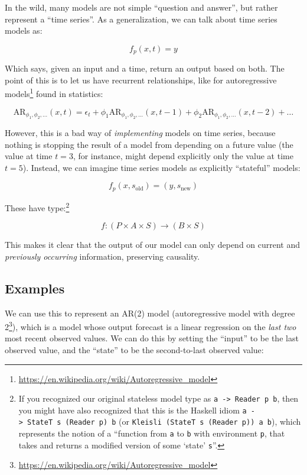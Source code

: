\documentclass[]{article}
\renewcommand{\href}[2]{#2\footnote{\url{#1}}}
\begin{document}
In the wild, many models are not simple ``question and answer'', but rather
represent a ``time series''. As a generalization, we can talk about time series
models as:

\[
f_p(x,t) = y
\]

Which says, given an input and a time, return an output based on both. The point
of this is to let us have recurrent relationships, like for
\href{https://en.wikipedia.org/wiki/Autoregressive_model}{autoregressive models}
found in statistics:

\[
\text{AR}_{\phi_1, \phi_2, \ldots}(x,t)
  = \epsilon_t + \phi_1 \text{AR}_{\phi_1, \phi_2, \ldots}(x, t-1)
  + \phi_2 \text{AR}_{\phi_1, \phi_2, \ldots}(x, t-2)
  + \ldots
\]

However, this is a bad way of \emph{implementing} models on time series, because
nothing is stopping the result of a model from depending on a future value (the
value at time \(t = 3\), for instance, might depend explicitly only the value at
time \(t = 5\)). Instead, we can imagine time series models as explicitly
``stateful'' models:

\[
f_p(x, s_{\text{old}}) = (y, s_{\text{new}})
\]

These have type:\footnote{If you recognized our original stateless model type as
  \texttt{a\ -\textgreater{}\ Reader\ p\ b}, then you might have also recognized
  that this is the Haskell idiom
  \texttt{a\ -\textgreater{}\ StateT\ s\ (Reader\ p)\ b} (or
  \texttt{Kleisli\ (StateT\ s\ (Reader\ p))\ a\ b}), which represents the notion
  of a ``function from \texttt{a} to \texttt{b} with environment \texttt{p},
  that takes and returns a modified version of some `state' \texttt{s}''.}

\[
f : (P \times A \times S) \rightarrow (B \times S)
\]

This makes it clear that the output of our model can only depend on current and
\emph{previously occurring} information, preserving causality.

\hypertarget{examples}{%
\subsection{Examples}\label{examples}}

We can use this to represent an AR(2) model
(\href{https://en.wikipedia.org/wiki/Autoregressive_model}{autoregressive model
with degree 2}), which is a model whose output forecast is a linear regression
on the \emph{last two} most recent observed values. We can do this by setting
the ``input'' to be the last observed value, and the ``state'' to be the
second-to-last observed value:
\end{document}
